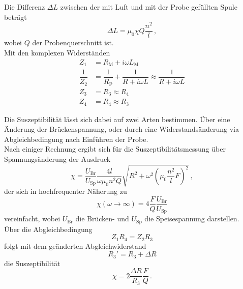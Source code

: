 Die Differenz $\Delta L$ zwischen der mit Luft und mit der Probe gefüllten Spule beträgt
\begin{equation}
    \Delta L = \mu_0 \chi Q \dfrac{n^2}{l} \,,
\end{equation}
wobei $Q$ der Probenquerschnitt ist. \\

Mit den komplexen Widerständen
\begin{align*}
    Z_1             &= R_\text{M} + i \omega L_\text{M} \\
    \dfrac{1}{Z_2}  &= \dfrac{1}{R_\text{P}} + \dfrac{1}{R + i \omega L} \approx \dfrac{1}{ R + i \omega L}\\
    Z_3             &= R_3                                               \approx R_4\\
    Z_4             &= R_4                                               \approx R_3
\end{align*}

Die Suszeptibilität lässt sich dabei auf zwei Arten bestimmen.
Über eine Änderung der Brückenspannung, oder durch eine Widerstandsänderung via Abgleichbedingung nach Einführen der Probe. \\

Nach einiger Rechnung ergibt sich für die Suszeptibilitätsmessung über Spannungsänderung der Ausdruck
\begin{equation}
    \chi = \dfrac{U_\text{Br}}{U_\text{Sp}} \dfrac{4 l}{\omega \mu_0 n^2 Q} \sqrt{R^2 + \omega^2 \left(\mu_0 \dfrac{n^2}{l} F \right)^2} \,,
    \label{eq:spannsusamogus}
\end{equation}
der sich in hochfrequenter Näherung zu
\begin{equation}
    \chi(\omega \rightarrow \infty) = 4 \dfrac{F}{Q} \dfrac{U_\text{Br}}{U_\text{Sp}}
    \label{eq:spannsussimp}
\end{equation}
vereinfacht, wobei $U_\text{Br}$ die Brücken- und $U_\text{Sp}$ die Speisespannung darstellen. \\

Über die Abgleichbedingung 
\begin{equation*}
    Z_1 R_4 = Z_2 R_3
\end{equation*}
folgt mit dem geänderten Abgleichwiderstand
\begin{equation*}
    R_3' = R_3 + \Delta R
\end{equation*}
die Suszeptibilität
\begin{equation}
    \chi = 2 \dfrac{\Delta R}{R_3} \dfrac{F}{Q} \,.
    \label{eq:widsus}
\end{equation}





